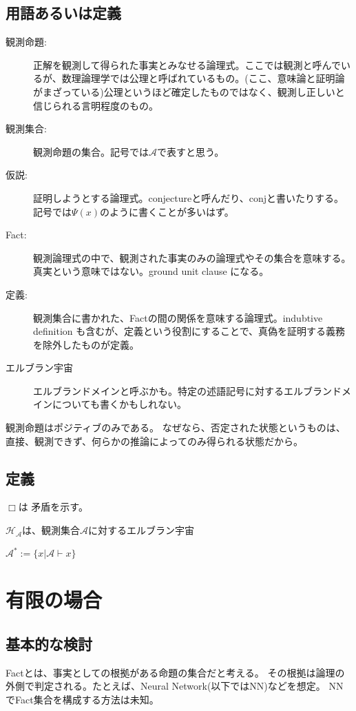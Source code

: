 \documentclass[10pt, oneside]{jarticle}   	%
\theoremstyle{definition}
\newcommand{\cont}{\Box}
\newcommand{\clos}[1]{\mathcal{#1}^{*}}
\begin{document}
\subsection{用語あるいは定義}
\begin{description}
\item[観測命題:] 正解を観測して得られた事実とみなせる論理式。ここでは観測と呼んでいるが、数理論理学では公理と呼ばれているもの。(ここ、意味論と証明論がまざっている)公理というほど確定したものではなく、観測し正しいと信じられる言明程度のもの。
\item[観測集合:] 観測命題の集合。記号では$\mathcal{A}$で表すと思う。
\item[仮説:] 証明しようとする論理式。conjectureと呼んだり、conjと書いたりする。記号では$\Psi(x)$のように書くことが多いはず。
\item[Fact:] 観測論理式の中で、観測された事実のみの論理式やその集合を意味する。真実という意味ではない。ground unit clause になる。
\item[定義:] 観測集合に書かれた、Factの間の関係を意味する論理式。indubtive definition も含むが、定義という役割にすることで、真偽を証明する義務を除外したものが定義。
\item[エルブラン宇宙] エルブランドメインと呼ぶかも。特定の述語記号に対するエルブランドメインについても書くかもしれない。
\end{description}


観測命題はポジティブのみである。
なぜなら、否定された状態というものは、直接、観測できず、何らかの推論によってのみ得られる状態だから。


\subsection{定義}

$\cont$は 矛盾を示す。

$\mathcal{H_{\mathcal{A}}}$は、観測集合$\mathcal{A}$に対するエルブラン宇宙

$\clos{A} := \{x | \mathcal{A} \vdash x\}$



\newpage

\section{有限の場合}
\subsection{基本的な検討}
Factとは、事実としての根拠がある命題の集合だと考える。
その根拠は論理の外側で判定される。たとえば、Neural Network(以下ではNN)などを想定。
NNでFact集合を構成する方法は未知。
\end{document}
